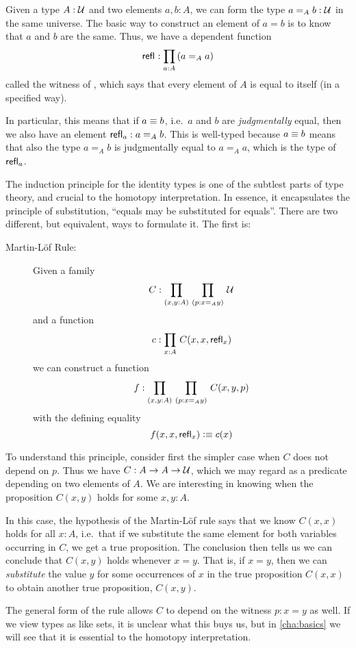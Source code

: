 Given a type $A:\mathcal{U}$ and two elements $a,b:A$, we can form the type $a=_A b:\mathcal{U}$ in the same universe.
The basic way to construct an element of $a=b$ is to know that $a$ and $b$ are the same.
Thus, we have a dependent function
\[\refl{} : \prd{a:A} (a =_A a)\]
called the witness of , which says that every element of $A$ is equal to itself (in a specified way).

In particular, this means that if $a\equiv b$, i.e.\ $a$ and $b$ are \emph{judgmentally} equal, then we also have an element $\mathsf{refl}_{a} : a=_A b$.
This is well-typed because $a\equiv b$ means that also the type $a=_A b$ is judgmentally equal to $a=_A a$, which is the type of $\mathsf{refl}_{a}$.

The induction principle for the identity types is one of the subtlest parts of type theory, and crucial to the homotopy interpretation.
In essence, it encapsulates the principle of substitution, ``equals may be substituted for equals''.
There are two different, but equivalent, ways to formulate it.
The first is:

\begin{description}
\item[Martin-L\"{o}f Rule:] 
Given a family 
\[ C : \prd{x,y:A}{p:x =_A y} \UU \]
and a function
\[ c :  \prd{x:A} C(x,x,\refl{x})\]
we can construct a function
\[ f : \prd{x,y:A}{p:x =_A y} C(x,y,p) \]
with the defining equality 
\[ f(x,x,\mathsf{refl}_{x}) \vcentcolon\equiv c(x) \]
\end{description}

To understand this principle, consider first the simpler case when $C$ does not depend on $p$.
Thus we have $C:A\to A\to \mathcal{U}$, which we may regard as a predicate depending on two elements of $A$.
We are interesting in knowing when the proposition $C(x,y)$ holds for some $x,y:A$.

In this case, the hypothesis of the Martin-L\"of rule says that we know $C(x,x)$ holds for all $x:A$, i.e.\ that if we substitute the same element for both variables occurring in $C$, we get a true proposition.
The conclusion then tells us we can conclude that $C(x,y)$ holds whenever $x=y$.
That is, if $x=y$, then we can \emph{substitute} the value $y$ for some occurrences of $x$ in the true proposition $C(x,x)$ to obtain another true proposition, $C(x,y)$.

The general form of the rule allows $C$ to depend on the witness $p:x=y$ as well.
If we view types as like sets, it is unclear what this buys us, but in \autoref{cha:basics} we will see that it is essential to the homotopy interpretation.

